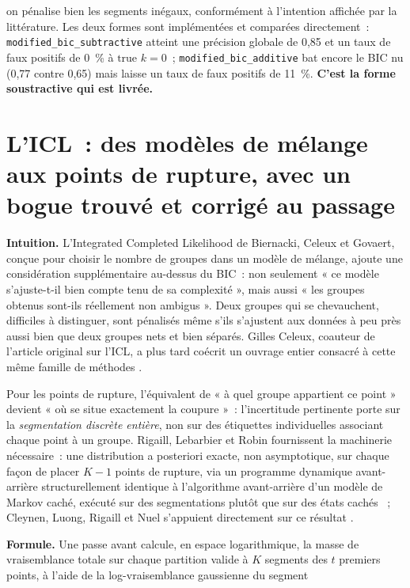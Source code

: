 \documentclass[11pt]{article}
\newcommand{\code}[1]{\texttt{#1}}
\begin{document}
on pénalise bien les segments inégaux, conformément à l'intention affichée
par la littérature. Les deux formes sont implémentées et comparées
directement~: \code{modified\_bic\_subtractive} atteint une précision
globale de 0,85 et un taux de faux positifs de 0~\% à $\text{true } k = 0$~;
\code{modified\_bic\_additive} bat encore le BIC nu (0,77 contre 0,65) mais
laisse un taux de faux positifs de 11~\%. \textbf{C'est la forme
soustractive qui est livrée.}

\section{L'ICL~: des modèles de mélange aux points de rupture, avec un bogue trouvé et corrigé au passage}

\textbf{Intuition.} L'Integrated Completed Likelihood de Biernacki, Celeux
et Govaert, conçue pour choisir le nombre de groupes dans un modèle de
mélange, ajoute une considération supplémentaire au-dessus du BIC~: non
seulement « ce modèle s'ajuste-t-il bien compte tenu de sa complexité »,
mais aussi « les groupes obtenus sont-ils réellement non ambigus ». Deux
groupes qui se chevauchent, difficiles à distinguer, sont pénalisés même
s'ils s'ajustent aux données à peu près aussi bien que deux groupes nets et
bien séparés. Gilles Celeux, coauteur de l'article original sur l'ICL, a
plus tard coécrit un ouvrage entier consacré à cette même famille de
méthodes \citep{bouveyron2021mbc}.

Pour les points de rupture, l'équivalent de « à quel groupe appartient ce
point » devient « où se situe exactement la coupure »~: l'incertitude
pertinente porte sur la \emph{segmentation discrète entière}, non sur des
étiquettes individuelles associant chaque point à un groupe. Rigaill,
Lebarbier et Robin fournissent la machinerie nécessaire~: une distribution
a posteriori exacte, non asymptotique, sur chaque façon de placer $K-1$
points de rupture, via un programme dynamique avant-arrière
structurellement identique à l'algorithme avant-arrière d'un modèle de
Markov caché, exécuté sur des segmentations plutôt que sur des états
cachés \citeyearpar{rigaill2012}~; Cleynen, Luong, Rigaill et Nuel
s'appuient directement sur ce résultat \citeyearpar{cleynen2013}.

\textbf{Formule.} Une passe avant calcule, en espace logarithmique, la
masse de vraisemblance totale sur chaque partition valide à $K$ segments
des $t$ premiers points, à l'aide de la log-vraisemblance gaussienne du
segment
\end{document}
